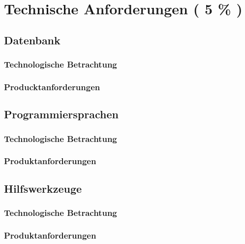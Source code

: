 \chapter{Technische Anforderungen ( 5 \% )}

\section{Datenbank}
\subsection{Technologische Betrachtung}
\subsection{Producktanforderungen}

\section{Programmiersprachen}
\subsection{Technologische Betrachtung}
\subsection{Produktanforderungen}

\section{Hilfswerkzeuge}
\subsection{Technologische Betrachtung}
\subsection{Produktanforderungen}
